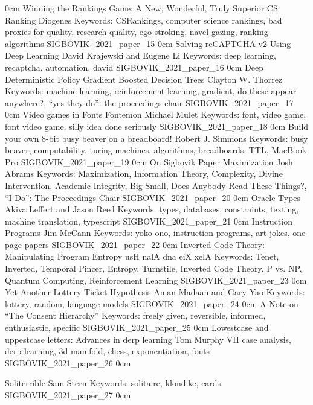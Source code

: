 	{0cm}
	{}
\addpaper
	{Winning the Rankings Game: A New, Wonderful, Truly Superior CS Ranking}
	{Diogenes}
	{Keywords: CSRankings, computer science rankings, bad proxies for quality, research quality, ego stroking, navel gazing, ranking algorithms}
	{SIGBOVIK_2021_paper_15}
	{0cm}
	{}
\addpaper
	{Solving reCAPTCHA v2 Using Deep Learning}
	{David Krajewski and Eugene Li}
	{Keywords: deep learning, recaptcha, automation, david}
	{SIGBOVIK_2021_paper_16}
	{0cm}
	{}
\addpaper
	{Deep Deterministic Policy Gradient Boosted Decision Trees}
	{Clayton W. Thorrez}
	{Keywords: machine learning, reinforcement learning, gradient, do these appear anywhere?, ``yes they do'': the proceedings chair}
	{SIGBOVIK_2021_paper_17}
	{0cm}
	{}
\addpaper
	{Video games in Fonts Fontemon}
	{Michael Mulet}
	{Keywords: font, video game, font video game, silly idea done seriously}
	{SIGBOVIK_2021_paper_18}
	{0cm}
	{}
\addpaper
	{Build your own 8-bit busy beaver on a breadboard!}
	{Robert J. Simmons}
	{Keywords: busy beaver, computability, turing machines, algorithms, breadboards, TTL, MacBook Pro}
	{SIGBOVIK_2021_paper_19}
	{0cm}
	{}
\addpaper
	{On Sigbovik Paper Maximization}
	{Josh Abrams}
	{Keywords: Maximization, Information Theory, Complexity, Divine Intervention, Academic Integrity, Big Small, Does Anybody Read These Things?, ``I Do'': The Proceedings Chair}
	{SIGBOVIK_2021_paper_20}
	{0cm}
	{}
\addpaper
	{Oracle Types}
	{Akiva Leffert and Jason Reed}
	{Keywords: types, databases, constraints, texting, machine translation, typescript}
	{SIGBOVIK_2021_paper_21}
	{0cm}
	{}
\addpaper
	{Instruction Programs}
	{Jim McCann}
	{Keywords: yoko ono, instruction programs, art jokes, one page papers}
	{SIGBOVIK_2021_paper_22}
	{0cm}
	{}
\addpaper
	{Inverted Code Theory: Manipulating Program Entropy}
	{usH nalA dna eiX xelA}
	{Keywords: Tenet, Inverted, Temporal Pincer, Entropy, Turnstile, Inverted Code Theory, P vs. NP, Quantum Computing, Reinforcement Learning}
	{SIGBOVIK_2021_paper_23}
	{0cm}
	{}
\addpaper
	{Yet Another Lottery Ticket Hypothesis}
	{Aman Madaan and Gary Yao}
	{Keywords: lottery, random, language models}
	{SIGBOVIK_2021_paper_24}
	{0cm}
	{}
\addpaper
	{A Note on ``The Consent Hierarchy''}
	{}
	{Keywords: freely given, reversible, informed, enthusiastic, specific}
	{SIGBOVIK_2021_paper_25}
	{0cm}
	{}
\addpaper
	{Lowestcase and uppestcase letters: Advances in derp learning}
	{Tom Murphy VII}
	{case analysis, derp learning, 3d manifold, chess, exponentiation, fonts}
	{SIGBOVIK_2021_paper_26}
	{0cm}
	{}

\addpaper
	{Soliterrible}
	{Sam Stern}
	{Keywords: solitaire, klondike, cards}
	{SIGBOVIK_2021_paper_27}
	{0cm}
	{}

